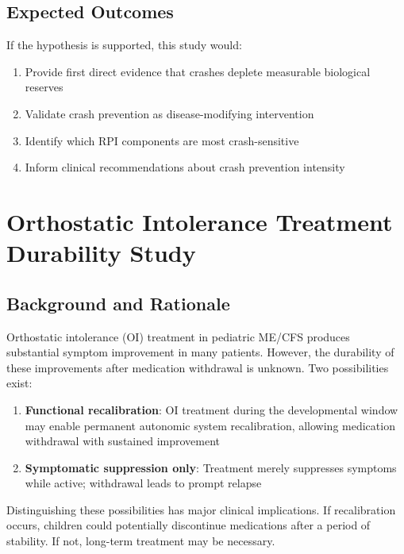 \subsection{Expected Outcomes}

If the hypothesis is supported, this study would:
\begin{enumerate}
    \item Provide first direct evidence that crashes deplete measurable biological reserves
    \item Validate crash prevention as disease-modifying intervention
    \item Identify which RPI components are most crash-sensitive
    \item Inform clinical recommendations about crash prevention intensity
\end{enumerate}

\section{Orthostatic Intolerance Treatment Durability Study}
\label{sec:oi-durability-study}

\subsection{Background and Rationale}

Orthostatic intolerance (OI) treatment in pediatric ME/CFS produces substantial symptom improvement in many patients. However, the durability of these improvements after medication withdrawal is unknown. Two possibilities exist:

\begin{enumerate}
    \item \textbf{Functional recalibration}: OI treatment during the developmental window may enable permanent autonomic system recalibration, allowing medication withdrawal with sustained improvement
    \item \textbf{Symptomatic suppression only}: Treatment merely suppresses symptoms while active; withdrawal leads to prompt relapse
\end{enumerate}

Distinguishing these possibilities has major clinical implications. If recalibration occurs, children could potentially discontinue medications after a period of stability. If not, long-term treatment may be necessary.

